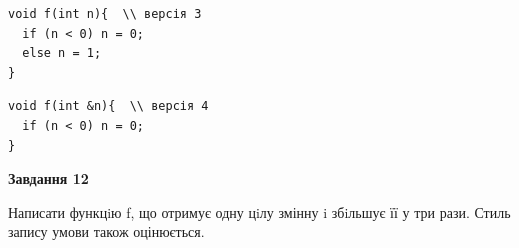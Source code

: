\documentclass[12pt, ukrainian]{article}
\begin{document}
{\begin {large}
\begin{minipage}[t]{11.0cm}
\vspace{-8mm}\begin{verbatim}
void f(int n){  \\ версія 3
  if (n < 0) n = 0;
  else n = 1;
}
\end{verbatim}

\vspace{-8mm}\begin{verbatim}
void f(int &n){  \\ версія 4
  if (n < 0) n = 0;
}
\end{verbatim}



\begin{center}
\textbf{Завдання 12}
\end{center}

Написати функцiю f, що отримує одну цiлу змінну i збiльшує її у три рази. Стиль запису умови також оцінюється.\par

\end{minipage}

\end {large}}
\newpage
\end{document}
